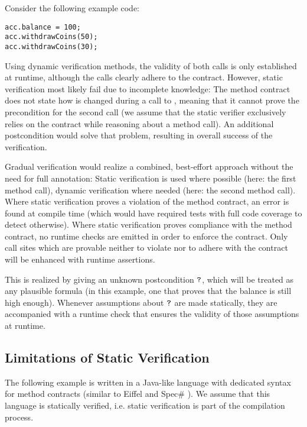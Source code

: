 Consider the following example code:
\begin{lstlisting}
acc.balance = 100;
acc.withdrawCoins(50);
acc.withdrawCoins(30);
\end{lstlisting}

Using dynamic verification methods, the validity of both calls is only established at runtime, although the calls clearly adhere to the contract.
However, static verification most likely fail due to incomplete knowledge:
The method contract does not state how  is changed during a call to , meaning that it cannot prove the precondition for the second call (we assume that the static verifier exclusively relies on the contract while reasoning about a method call).
An additional postcondition  would solve that problem, resulting in overall success of the verification.

Gradual verification would realize a combined, best-effort approach without the need for full annotation:
Static verification is used where possible (here: the first method call), dynamic verification where needed (here: the second method call).
Where static verification proves a violation of the method contract, an error is found at compile time (which would have required tests with full code coverage to detect otherwise).
Where static verification proves compliance with the method contract, no runtime checks are emitted in order to enforce the contract.
Only call sites which are provable neither to violate nor to adhere with the contract will be enhanced with runtime assertions.

This is realized by giving  an unknown postcondition $\textup{\texttt{?}}$, which will be treated as any plausible formula (in this example, one that proves that the balance is still high enough).
Whenever assumptions about $\textup{\texttt{?}}$ are made statically, they are accompanied with a runtime check that ensures the validity of those assumptions at runtime.


\subsection{Limitations of Static Verification}
\label{ssec:limitations-of-static}
The following example is written in a Java-like language with dedicated syntax for method contracts (similar to Eiffel \cite{meyer1988eiffel} and Spec\# \cite{the-spec-programming-system-an-overview}).
We assume that this language is statically verified, i.e. static verification is part of the compilation process.

